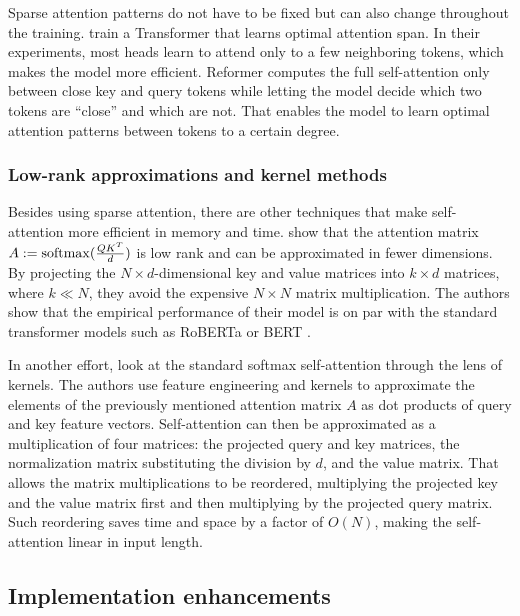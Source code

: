Sparse attention patterns do not have to be fixed but can also change
throughout the training. \cite{sukhbaatar2019adaptive} train a Transformer that
learns optimal attention span. In their experiments, most heads learn to attend
only to a few neighboring tokens, which makes the model more efficient.
Reformer \citep{kitaev2020reformer} computes the full self-attention only
between close key and query tokens while letting the model decide which two
tokens are ``close'' and which are not. That enables the model to learn optimal
attention patterns between tokens to a certain degree.

\subsubsection{Low-rank approximations and kernel methods}

Besides using sparse attention, there are other techniques that make self-attention more
efficient in memory and time. \cite{wang2020linformer} show that the
attention matrix $A := \operatorname*{softmax}(\frac{QK^T}{d})$ is low rank and can be approximated in fewer dimensions. By projecting the $N \times
d$-dimensional key and value matrices into $k \times d$ matrices, where $k\ll
N$, they avoid the expensive $N\times N$ matrix multiplication. The authors show
that the empirical performance of their model is on par with the standard
transformer models such as RoBERTa \citep{liu2019roberta} or
BERT \citep{devlin2019bert}.

In another effort, \cite{choromanski2020rethinking} look at the standard
softmax self-attention through the lens of kernels. The authors use feature
engineering and kernels to approximate the elements of the previously mentioned attention
matrix $A$ as dot products of query and key feature vectors. Self-attention can
then be approximated as a multiplication of four matrices: the projected query
and key matrices, the normalization matrix substituting the division by $d$, and
the value matrix. That allows the matrix multiplications to be reordered, 
multiplying the projected key and the value matrix first and then multiplying
by the projected query matrix. Such reordering saves time and space by a
factor of $O(N)$, making the self-attention linear in input length.

\subsection{Implementation enhancements}

